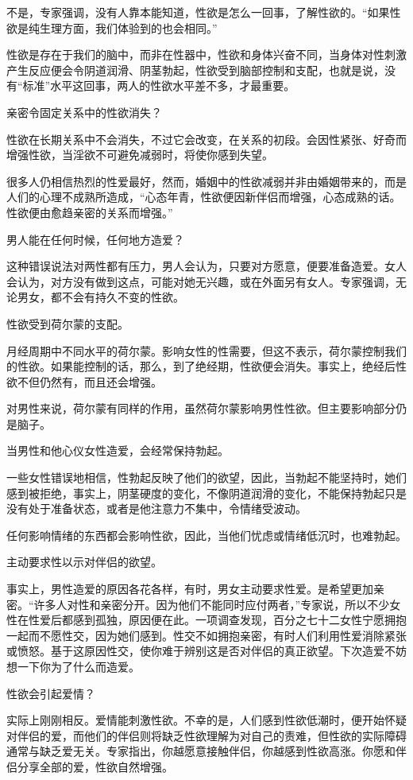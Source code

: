 \documentclass[12pt,UTF8]{ctexbook}
\begin{document}
不是，专家强调，没有人靠本能知道，性欲是怎么一回事，了解性欲的。“如果性欲是纯生理方面，我们体验到的也会相同。”

性欲是存在于我们的脑中，而非在性器中，性欲和身体兴奋不同，当身体对性刺激产生反应便会令阴道润滑、阴茎勃起，性欲受到脑部控制和支配，也就是说，没有“标准”水平这回事，两人的性欲水平差不多，才最重要。

亲密令固定关系中的性欲消失？

性欲在长期关系中不会消失，不过它会改变，在关系的初段。会因性紧张、好奇而增强性欲，当淫欲不可避免减弱时，将使你感到失望。

很多人仍相信热烈的性爱最好，然而，婚姻中的性欲减弱并非由婚姻带来的，而是人们的心理不成熟所造成，“心态年青，性欲便因新伴侣而增强，心态成熟的话。性欲便由愈趋亲密的关系而增强。”

男人能在任何时候，任何地方造爱？

这种错误说法对两性都有压力，男人会认为，只要对方愿意，便要准备造爱。女人会认为，对方没有做到这点，可能对她无兴趣，或在外面另有女人。专家强调，无论男女，都不会有持久不变的性欲。

性欲受到荷尔蒙的支配。

月经周期中不同水平的荷尔蒙。影响女性的性需要，但这不表示，荷尔蒙控制我们的性欲。如果能控制的话，那么，到了绝经期，性欲便会消失。事实上，绝经后性欲不但仍然有，而且还会增强。

对男性来说，荷尔蒙有同样的作用，虽然荷尔蒙影响男性性欲。但主要影响部分仍是脑子。

当男性和他心仪女性造爱，会经常保持勃起。

一些女性错误地相信，性勃起反映了他们的欲望，因此，当勃起不能坚持时，她们感到被拒绝，事实上，阴茎硬度的变化，不像阴道润滑的变化，不能保持勃起只是没有处于准备状态，或者是他注意力不集中，令情绪受波动。

任何影响情绪的东西都会影响性欲，因此，当他们忧虑或情绪低沉时，也难勃起。

主动要求性以示对伴侣的欲望。

事实上，男性造爱的原因各花各样，有时，男女主动要求性爱。是希望更加亲密。“许多人对性和亲密分开。因为他们不能同时应付两者，”专家说，所以不少女性在性爱后都感到孤独，原因便在此。一项调查发现，百分之七十二女性宁愿拥抱一起而不愿性交，因为她们感到。性交不如拥抱亲密，有时人们利用性爱消除紧张或愤怒。基于这原因性交，使你难于辨别这是否对伴侣的真正欲望。下次造爱不妨想一下你为了什么而造爱。

性欲会引起爱情？

实际上刚刚相反。爱情能刺激性欲。不幸的是，人们感到性欲低潮时，便开始怀疑对伴侣的爱，而他们的伴侣则将缺乏性欲理解为对自己的责难，但性欲的实际障碍通常与缺乏爱无关。专家指出，你越愿意接触伴侣，你越感到性欲高涨。你愿和伴侣分享全部的爱，性欲自然增强。
\end{document}

